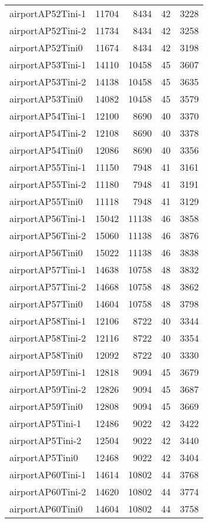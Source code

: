 \begin{tabular}{lrrrr}
airportAP52Tini-1 & 11704 & 8434 & 42 & 3228 \\
airportAP52Tini-2 & 11734 & 8434 & 42 & 3258 \\
airportAP52Tini0 & 11674 & 8434 & 42 & 3198 \\
airportAP53Tini-1 & 14110 & 10458 & 45 & 3607 \\
airportAP53Tini-2 & 14138 & 10458 & 45 & 3635 \\
airportAP53Tini0 & 14082 & 10458 & 45 & 3579 \\
airportAP54Tini-1 & 12100 & 8690 & 40 & 3370 \\
airportAP54Tini-2 & 12108 & 8690 & 40 & 3378 \\
airportAP54Tini0 & 12086 & 8690 & 40 & 3356 \\
airportAP55Tini-1 & 11150 & 7948 & 41 & 3161 \\
airportAP55Tini-2 & 11180 & 7948 & 41 & 3191 \\
airportAP55Tini0 & 11118 & 7948 & 41 & 3129 \\
airportAP56Tini-1 & 15042 & 11138 & 46 & 3858 \\
airportAP56Tini-2 & 15060 & 11138 & 46 & 3876 \\
airportAP56Tini0 & 15022 & 11138 & 46 & 3838 \\
airportAP57Tini-1 & 14638 & 10758 & 48 & 3832 \\
airportAP57Tini-2 & 14668 & 10758 & 48 & 3862 \\
airportAP57Tini0 & 14604 & 10758 & 48 & 3798 \\
airportAP58Tini-1 & 12106 & 8722 & 40 & 3344 \\
airportAP58Tini-2 & 12116 & 8722 & 40 & 3354 \\
airportAP58Tini0 & 12092 & 8722 & 40 & 3330 \\
airportAP59Tini-1 & 12818 & 9094 & 45 & 3679 \\
airportAP59Tini-2 & 12826 & 9094 & 45 & 3687 \\
airportAP59Tini0 & 12808 & 9094 & 45 & 3669 \\
airportAP5Tini-1 & 12486 & 9022 & 42 & 3422 \\
airportAP5Tini-2 & 12504 & 9022 & 42 & 3440 \\
airportAP5Tini0 & 12468 & 9022 & 42 & 3404 \\
airportAP60Tini-1 & 14614 & 10802 & 44 & 3768 \\
airportAP60Tini-2 & 14620 & 10802 & 44 & 3774 \\
airportAP60Tini0 & 14604 & 10802 & 44 & 3758 \\

\end{tabular}
